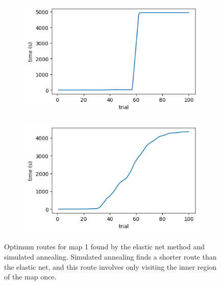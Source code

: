 \documentclass{article}
\begin{document}
\begin{figure}[h]
	\centering
	\begin{subfigure}[t]{0.28\linewidth}
		\centering
		\includegraphics[width = 1.0\linewidth, trim={0 0 0 0}, clip=true]{figures/learn500000_performance.png}
		\label{fig:comp1el}	
	\end{subfigure}%
	\hspace{0.1\linewidth}
	\begin{subfigure}[t]{0.28\linewidth}
		\centering
		\includegraphics[width = 1.0\linewidth, trim={0 0 0 0}, clip=true]{figures/real_meanperformance.png}
		\label{fig:comp1an}	
	\end{subfigure}
\caption{Optimum routes for map 1 found by the elastic net method and simulated annealing. Simulated annealing finds a shorter route than the elastic net, and this route involves only visiting the inner region of the map once. }
\label{fig:comp1}
\end{figure}
\end{document}
